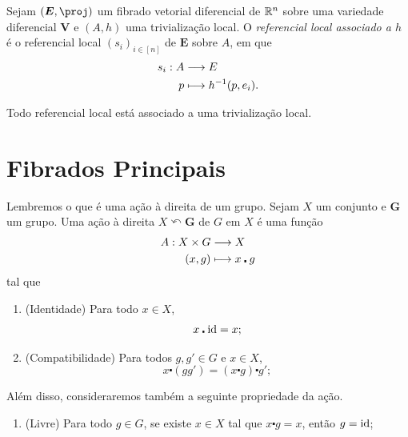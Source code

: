 \begin{defi}
Sejam $(\bm E,\proj)$ um fibrado vetorial diferencial de $\mathbb{R}^n$ sobre uma variedade diferencial $\bm V$ e $(A,h)$ uma trivialização local. O \emph{referencial local associado a $h$} é o referencial local $(s_i)_{i \in [n]}$ de $\bm E$ sobre $A$, em que
	\begin{align*}
	{s_i}: {A} &\longrightarrow {E} \\{p} &\longmapsto {h^{-1}(p,e_i)}.
	\end{align*}
\end{defi}

\begin{exerc}
Todo referencial local está associado a uma trivialização local.
\end{exerc}






\section{Fibrados Principais}

Lembremos o que é uma ação à direita de um grupo. Sejam $X$ um conjunto e $\bm G$ um grupo. Uma ação à direita $X \curvearrowleft \bm G$ de $G$ em $X$ é uma função
	\begin{align*}
	{A}: {X \times G} &\longrightarrow {X} \\{(x,g)} &\longmapsto {x \centerdot g}
	\end{align*}
tal que
	\begin{enumerate}
	\item (Identidade) Para todo $x \in X$,
		\begin{equation*}
		x \centerdot \mathrm{id} = x;
		\end{equation*}

	\item (Compatibilidade) Para todos $g,g' \in G$ e $x \in X$,
		\begin{equation*}
		x \centerdot (gg') = (x \centerdot g) \centerdot g';
		\end{equation*}
	\end{enumerate}

Além disso, consideraremos também a seguinte propriedade da ação.
	\begin{enumerate}
%	
	\item (Livre) Para todo $g \in G$, se existe $x \in X$ tal que $x \centerdot g = x$, então $g=\mathrm{id}$;
%	
	\end{enumerate}
%


